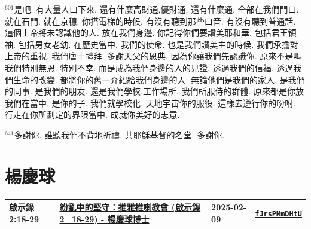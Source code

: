 \documentclass{book}
\begin{document}
$^{601}$是吧.
有大量人口下來.
還有什麼高財通,優財通.
還有什麼通.
全部在我們門口.
就在石門.
就在京穗.
你搭電梯的時候.
有沒有聽到那些口音.
有沒有聽到普通話.
這個上帝將未認識他的人.
放在我們身邊.
你記得你們要讚美耶和華.
包括君王領袖.
包括男女老幼.
在歷史當中.
我們的使命.
也是我們讚美主的時候.
我們承擔對上帝的重視.
我們唐十禮拜.
多謝天父的恩典.
因為你讓我們先認識你.
原來不是叫我們特別無恩.
特別不幸.
而是成為我們身邊的人的見證.
透過我們的信福.
透過我們生命的改變.
都將你的舊一介紹給我們身邊的人.
無論他們是我們的家人.
是我們的同事.
是我們的朋友.
還是我們學校,工作場所.
我們所服侍的群體.
原來都是你放我們在當中.
是你的子.
我們就學校化.
天地宇宙你的服役.
這樣去遵行你的吩咐.
行走在你所劃定的界限當中.
成就你美好的志意.

$^{641}$多謝你.
誰聽我們不背地祈禱.
共耶穌基督的名堂.
多謝你.
\newpage



\chapter{楊慶球}\label{ch:preacher6}
\begin{multicols}{3}
\minitoc
\end{multicols}
{ \scriptsize


\begin{xltabular}{\textwidth}{|p{0.15\textwidth} p{0.6\textwidth}|p{0.07\textwidth} p{0.1\textwidth}|}
\hline
啟示錄 2:18-29 & \hyperref[sec:fJrsPMmDHtU]{紛亂中的堅守︰推雅推喇教會 (啟示錄2\_18-29) - 楊慶球博士} & 2025-02-09 & \href{https://youtube.com/watch?v=fJrsPMmDHtU}{\texttt{fJrsPMmDHtU}} \\
\hline
\end{xltabular}
}
\newpage
\end{document}
